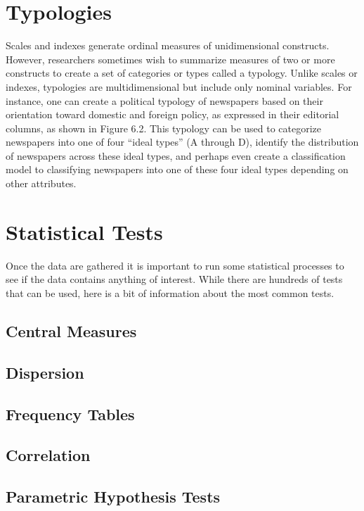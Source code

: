 \section{Typologies}

Scales and indexes generate ordinal measures of unidimensional constructs. However, researchers sometimes wish to summarize measures of two or more constructs to create a set of categories or types called a typology. Unlike scales or indexes, typologies are multidimensional but include only nominal variables. For instance, one can create a political typology of newspapers based on their orientation toward domestic and foreign policy, as expressed in their editorial columns, as shown in Figure 6.2. This typology can be used to categorize newspapers into one of four ``ideal types'' (A through D), identify the distribution of newspapers across these ideal types, and perhaps even create a classification model to classifying newspapers into one of these four ideal types depending on other attributes.

\section{Statistical Tests}

Once the data are gathered it is important to run some statistical processes to see if the data contains anything of interest. While there are hundreds of tests that can be used, here is a bit of information about the most common tests.

\subsection{Central Measures}

\subsection{Dispersion}

\subsection{Frequency Tables}

\subsection{Correlation}

\subsection{Parametric Hypothesis Tests}

